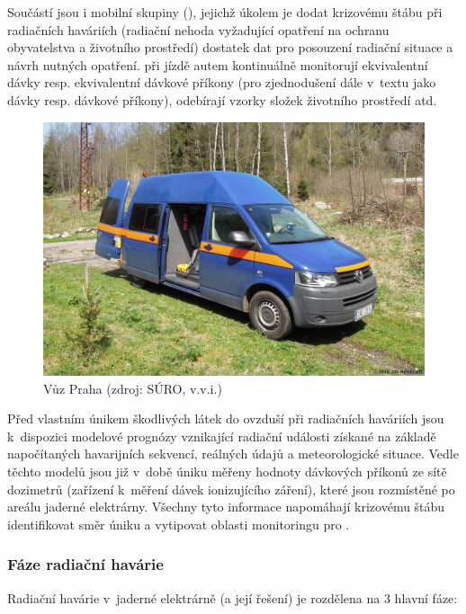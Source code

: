 Součástí  jsou i mobilní skupiny (), jejichž úkolem je
dodat krizovému štábu při radiačních haváriích (radiační nehoda
vyžadující opatření na ochranu obyvatelstva a životního prostředí)
dostatek dat pro posouzení radiační situace a návrh nutných
opatření.  při jízdě autem kontinuálně monitorují ekvivalentní
dávky resp. ekvivalentní dávkové příkony (pro zjednodušení dále
v~textu jako dávky resp. dávkové příkony), odebírají vzorky složek
životního prostředí atd.  \cite{metodika} \cite{pecha2011monitorovani}

\begin{figure}[H] \centering
    \includegraphics[scale=0.6]{./pictures/vuzSURO.jpg}
      	\caption[Vůz   Praha]{Vůz  
Praha (zdroj: SÚRO, v.v.i.)}
    	\label{fig:vuzSURO}
\end{figure}

Před vlastním únikem škodlivých látek do ovzduší při radiačních
haváriích jsou k~dispozici modelové prognózy vznikající radiační
události získané na základě napočítaných havarijních sekvencí,
reálných údajů a meteorologické situace. Vedle těchto modelů jsou již
v~době úniku měřeny hodnoty dávkových příkonů ze sítě dozimetrů
(zařízení k~měření dávek ionizujícího záření), které jsou rozmístěné
po areálu jaderné elektrárny. Všechny tyto informace napomáhají
krizovému štábu identifikovat směr úniku a vytipovat oblasti
monitoringu pro .

\subsubsection{Fáze radiační havárie}

Radiační havárie v~jaderné elektrárně (a její řešení) je rozdělena na
3 hlavní fáze:

